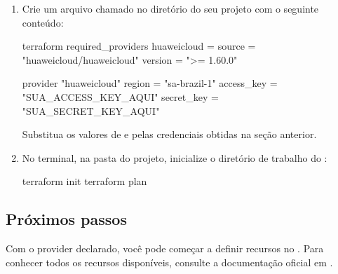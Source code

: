 \documentclass{labguide}
\begin{document}
\passoapasso
\begin{enumerate}
  \item Crie um arquivo chamado  no diretório do seu
        projeto com o seguinte conteúdo:

\begin{codigo}
terraform {
  required_providers {
    huaweicloud = {
      source  = "huaweicloud/huaweicloud"
      version = ">= 1.60.0"
    }
  }
}

provider "huaweicloud" {
  region     = "sa-brazil-1"
  access_key = "SUA_ACCESS_KEY_AQUI"
  secret_key = "SUA_SECRET_KEY_AQUI"
}
\end{codigo}

  Substitua os valores de  e  pelas
  credenciais obtidas na seção anterior.

  \item No terminal, na pasta do projeto, inicialize o diretório de trabalho
        do :

\begin{codigo}[bash]
terraform init
terraform plan
\end{codigo}

\end{enumerate}

\subsection{Próximos passos}

Com o provider declarado, você pode começar a definir recursos no
. Para conhecer todos os recursos disponíveis, consulte a
documentação oficial em
.

\end{document}
